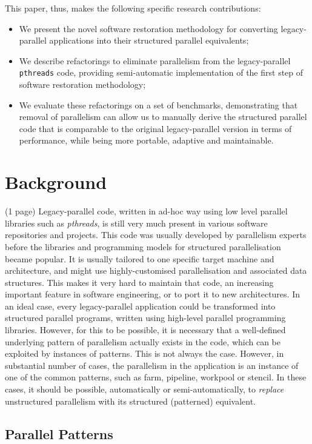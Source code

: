 \documentclass{llncs}
\begin{document}
This paper, thus, makes the following specific research contributions:
\begin{itemize}
    \item We present the novel software restoration methodology for converting legacy-parallel applications into their structured parallel equivalents;
    \item We describe refactorings to eliminate parallelism from the legacy-parallel \lstinline{pthreads} code, providing semi-automatic implementation of the first step of software restoration methodology;
    \item We evaluate these refactorings on a set of benchmarks, demonstrating that removal of parallelism can allow us to manually derive the structured parallel code that is comparable to the original legacy-parallel version in terms of performance, while being more portable, adaptive and maintainable.
\end{itemize}

\section{Background} (1 page)
Legacy-parallel code, written in ad-hoc way using low level parallel libraries such as \emph{pthreads}, is still very much present in various software repositories and projects. This code was usually developed by parallelism experts before the libraries and programming models for structured parallelisation became popular. It is usually tailored to one specific target machine and architecture, and might use highly-customised parallelisation and associated data structures. This makes it very hard to maintain that code, an increasing important feature in software engineering, or to port it to new architectures. In an ideal case, every legacy-parallel application could be transformed into structured parallel programs, written using high-level parallel programming libraries. However, for this to be possible, it is necessary that a well-defined underlying pattern of parallelism actually exists in the code, which can be exploited by instances of patterns. This is not always the case. However, in substantial number of cases, the parallelism in the application is an instance of one of the common patterns, such as farm, pipeline, workpool or stencil. In these cases, it should be possible, automatically or semi-automatically, to \emph{replace} unstructured parallelism with its structured (patterned) equivalent.   

\subsection{Parallel Patterns}
\end{document}
